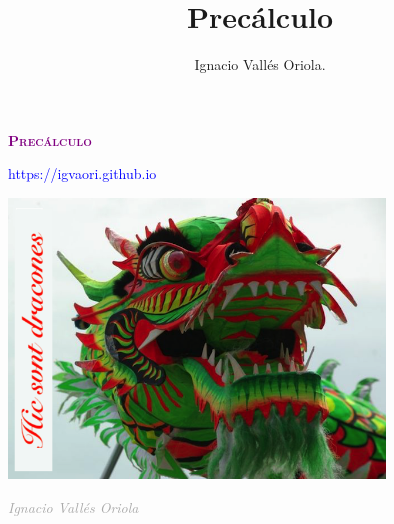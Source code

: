 \documentclass[a4paper, 11pt, spanish]{book}
\title{Precálculo}
\author{Ignacio Vallés Oriola.}
\date{}
\numberwithin{equation}{chapter}
\numberwithin{teor}{chapter}
\numberwithin{coro}{chapter}
\numberwithin{prop}{chapter}
\numberwithin{defi}{chapter}
\numberwithin{axio}{chapter}
\numberwithin{ejem}{chapter}
\numberwithin{ejer}{chapter}
\numberwithin{ejre}{chapter}
\numberwithin{ayud}{chapter}
\numberwithin{solu}{chapter}
\numberwithin{prob}{chapter}
\begin{document}
\begin{titlepage}
	\centering
	\vspace*{\fill}
	{\scshape\Huge \textcolor{purple}{\textbf{Precálculo}}\par}
	\vspace{1cm}
	\vspace{1cm}
	{\scriptsize  \textcolor{blue}{https://igvaori.github.io}    \par}

	\vspace{2cm}
	\includegraphics[width=0.75\textwidth]{imagenes/hic-svnt-dracones}
	\vspace{2cm}
	\begin{flushright}
		{\normalsize \textcolor{darkgray}{\textit{Ignacio Vallés Oriola}} \par}
	\end{flushright}
\end{titlepage}


\tableofcontents

%
%
%
%
%
%
%
%
%
%
\appendix

	
\end{document}
